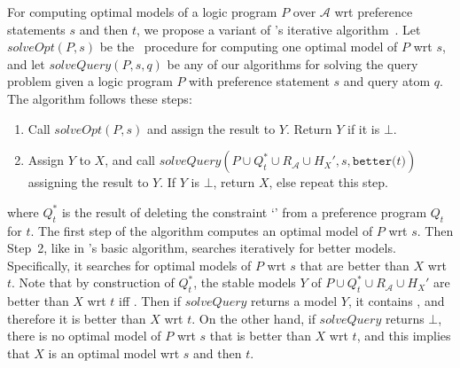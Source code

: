 For computing optimal models of a logic program $P$ over $\mathcal{A}$ wrt preference statements $s$ and then $t$, 
we propose a variant of \asprin's iterative algorithm~\cite{brderosc15a}.
%
Let $\mathit{solveOpt}(P,s)$ be the \asprin\ procedure for computing one optimal model of $P$ wrt $s$, 
and let $\mathit{solveQuery}(P,s,q)$ be any of our algorithms for solving the query problem  
given a logic program $P$ with preference statement $s$ and query atom $q$.
%
The algorithm follows these steps:
\begin{enumerate}
\item
Call $\mathit{solveOpt}(P,s)$ and assign the result to $Y$. Return $Y$ if it is $\bot$.
\item
Assign $Y$ to $X$, and call $\mathit{solveQuery}(P \cup Q_t^* \cup R_\mathcal{A} \cup H_{X}',s,\mathtt{better(}t\mathtt{)})$ assigning the result to $Y$.
If $Y$ is $\bot$, return $X$, else repeat this step.
\end{enumerate}
where $Q_t^*$ is the result of deleting the constraint `' 
from a preference program $Q_t$ for $t$.
%
The first step of the algorithm computes an optimal model of $P$ wrt $s$.
%
Then Step~2, like in \asprin's basic algorithm, searches iteratively for better models. 
%
Specifically, it searches for optimal models of $P$ wrt $s$ that are better than $X$ wrt $t$.
%
Note that by construction of $Q_t^*$, 
the stable models $Y$ of $P \cup Q_t^* \cup R_\mathcal{A} \cup H_{X}'$ 
are better than $X$ wrt $t$ iff . 
%
Then if $\mathit{solveQuery}$ returns a model $Y$, it contains ,
and therefore it is better than $X$ wrt $t$.
%
On the other hand, if $\mathit{solveQuery}$ returns $\bot$, there is no optimal model of $P$ wrt $s$ that is better than $X$ wrt $t$, 
and this implies that $X$ is an optimal model wrt $s$ and then $t$.

